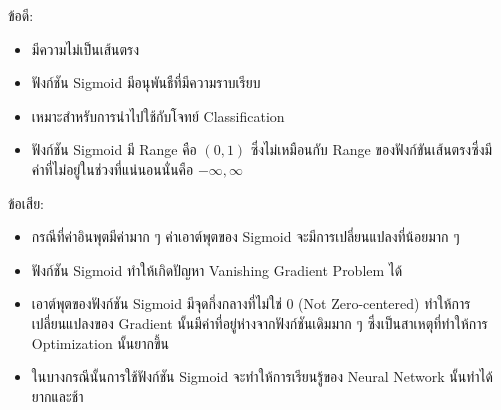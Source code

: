 \noindent ข้อดี:
\begin{itemize}[topsep=0pt,noitemsep]\setlength\itemsep{0.5em}
  \item มีความไม่เป็นเส้นตรง

  \item ฟังก์ชัน Sigmoid มีอนุพันธืที่มีความราบเรียบ

  \item เหมาะสำหรับการนำไปใช้กับโจทย์ Classification

  \item ฟังก์ชัน Sigmoid มี Range คือ $(0,1)$ ซึ่งไม่เหมือนกับ Range ของฟังก์ขันเส้นตรงซึ่งมีค่าที่ไม่อยู่ในช่วงที่แน่นอนนั่นคือ $-\infty, \infty$
\end{itemize}
%
ข้อเสีย:
\begin{itemize}[topsep=0pt,noitemsep]\setlength\itemsep{0.5em}
  \item กรณีที่ค่าอินพุตมีค่ามาก ๆ ค่าเอาต์พุตของ Sigmoid จะมีการเปลี่ยนแปลงที่น้อยมาก ๆ

  \item ฟังก์ชัน Sigmoid ทำให้เกิดปัญหา Vanishing Gradient Problem ได้

  \item เอาต์พุตของฟังก์ชัน Sigmoid มีจุดกึ่งกลางที่ไม่ใช่ 0 (Not Zero-centered) ทำให้การเปลี่ยนแปลงของ Gradient นั้นมีค่าที่อยู่ห่างจากฟังก์ชันเดิมมาก ๆ ซึ่งเป็นสาเหตุที่ทำให้การ Optimization นั้นยากขึ้น

  \item ในบางกรณีนั้นการใช้ฟังก์ชัน Sigmoid จะทำให้การเรียนรู้ของ Neural Network นั้นทำได้ยากและช้า
\end{itemize}
%
